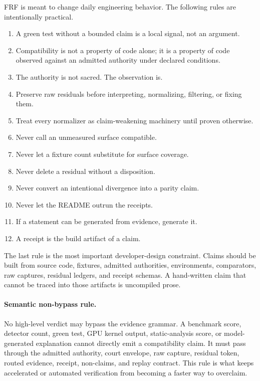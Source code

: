 \documentclass[11pt,a4paper]{article}
\newcommand{\frf}{\textsc{FRF}}
\begin{document}
\frf{} is meant to change daily engineering behavior. The following rules are intentionally practical.

\begin{enumerate}
\item A green test without a bounded claim is a local signal, not an argument.
\item Compatibility is not a property of code alone; it is a property of code observed against an admitted authority under declared conditions.
\item The authority is not sacred. The observation is.
\item Preserve raw residuals before interpreting, normalizing, filtering, or fixing them.
\item Treat every normalizer as claim-weakening machinery until proven otherwise.
\item Never call an unmeasured surface compatible.
\item Never let a fixture count substitute for surface coverage.
\item Never delete a residual without a disposition.
\item Never convert an intentional divergence into a parity claim.
\item Never let the README outrun the receipts.
\item If a statement can be generated from evidence, generate it.
\item A receipt is the build artifact of a claim.
\end{enumerate}

The last rule is the most important developer-design constraint. Claims should be built from source code, fixtures, admitted authorities, environments, comparators, raw captures, residual ledgers, and receipt schemas. A hand-written claim that cannot be traced into those artifacts is uncompiled prose.

\paragraph{Semantic non-bypass rule.}
No high-level verdict may bypass the evidence grammar. A benchmark score, detector count, green test, GPU kernel output, static-analysis score, or model-generated explanation cannot directly emit a compatibility claim. It must pass through the admitted authority, court envelope, raw capture, residual token, routed evidence, receipt, non-claims, and replay contract. This rule is what keeps accelerated or automated verification from becoming a faster way to overclaim.
\end{document}
